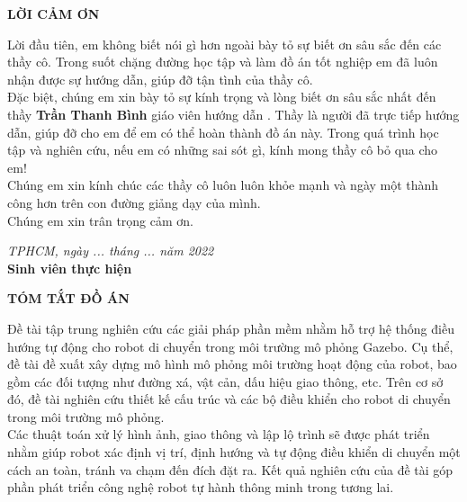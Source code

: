 \documentclass[a4paper, 13pt]{article}
\begin{document}
\newpage
\begin{center}
\textbf{\large LỜI CẢM ƠN}
\end{center}
Lời đầu tiên, em không biết nói gì hơn ngoài bày tỏ sự biết ơn sâu sắc đến các thầy cô. Trong suốt chặng đường học tập và làm đồ án tốt nghiệp em đã luôn nhận được sự hướng dẫn, giúp đỡ tận tình của thầy cô.\\
Đặc biệt, chúng em xin bày tỏ sự kính trọng và lòng biết ơn sâu sắc nhất đến thầy \textbf{Trần Thanh Bình} giáo viên hướng dẫn . Thầy là người đã trực tiếp hướng dẫn, giúp đỡ cho em để em có thể hoàn thành đồ án này. Trong quá trình học tập và nghiên cứu, nếu em có những sai sót gì, kính mong thầy cô bỏ qua cho em!\\Chúng em xin kính chúc các thầy cô luôn luôn khỏe mạnh và ngày một thành công hơn trên con đường giảng dạy của mình.\\Chúng em xin trân trọng cảm ơn.\\
\vspace{1cm}
\begin{flushright}
\textit{ TPHCM, ngày ... tháng ... năm 2022}\\
\textbf{Sinh viên thực hiện}
\medskip
\end{flushright}
\newpage
\begin{center}
\textbf{\large TÓM TẮT ĐỒ ÁN}
\end{center}
Đề tài tập trung nghiên cứu các giải pháp phần mềm nhằm hỗ trợ hệ thống điều hướng tự động cho robot di chuyển trong môi trường mô phỏng Gazebo. Cụ thể, đề tài đề xuất xây dựng mô hình mô phỏng môi trường hoạt động của robot, bao gồm các đối tượng như đường xá, vật cản, dấu hiệu giao thông, etc. Trên cơ sở đó, đề tài nghiên cứu thiết kế cấu trúc và các bộ điều khiển cho robot di chuyển trong môi trường mô phỏng.\\ Các thuật toán xử lý hình ảnh, giao thông và lập lộ trình sẽ được phát triển nhằm giúp robot xác định vị trí, định hướng và tự động điều khiển di chuyển một cách an toàn, tránh va chạm đến đích đặt ra. Kết quả nghiên cứu của đề tài góp phần phát triển công nghệ robot tự hành thông minh trong tương lai.
\newpage
\thispagestyle{empty}
\tableofcontents
\newpage






\end{document}

